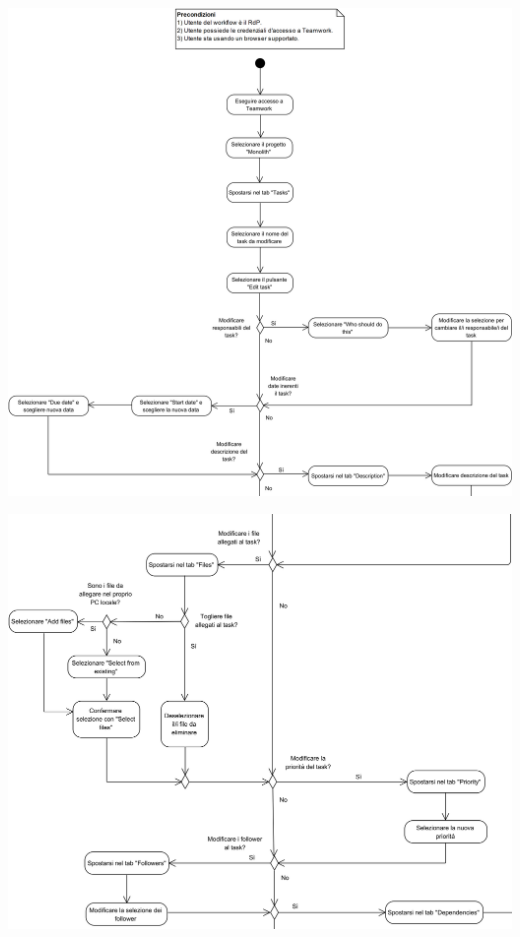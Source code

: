 \begin{samepage}
	\mbox{}\\
	
	\begin{center}
		\includegraphics[width=15cm]{../../documenti/NormeDiProgetto/DiagrammiProcedure/EditTask1.png}
	\end{center}
	
\end{samepage}

\begin{center}
	\includegraphics[width=15cm]{./DiagrammiProcedure/EditTask2.png}
\end{center}

